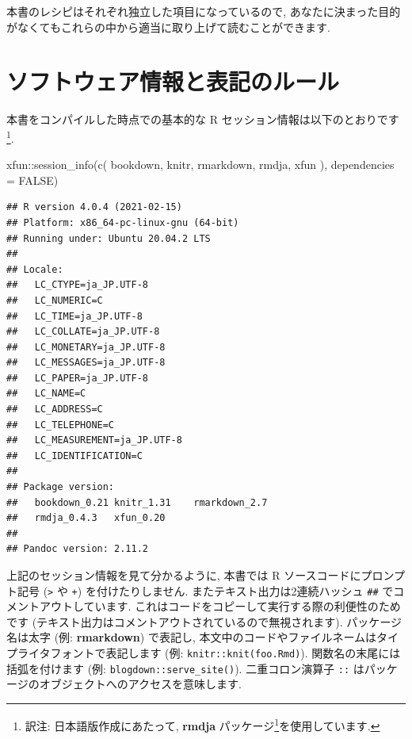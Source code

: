 \documentclass[
  11pt,
]{bxjsreport}
\newenvironment{Shaded}{\begin{snugshade}}{\end{snugshade}}
\newcommand{\AttributeTok}[1]{\textcolor[rgb]{0.77,0.63,0.00}{#1}}
\newcommand{\ConstantTok}[1]{\textcolor[rgb]{0.00,0.00,0.00}{#1}}
\newcommand{\FunctionTok}[1]{\textcolor[rgb]{0.00,0.00,0.00}{#1}}
\newcommand{\NormalTok}[1]{#1}
\newcommand{\SpecialCharTok}[1]{\textcolor[rgb]{0.00,0.00,0.00}{#1}}
\newcommand{\StringTok}[1]{\textcolor[rgb]{0.31,0.60,0.02}{#1}}
\renewcommand{\href}[2]{#2\footnote{\url{#1}}}
\begin{document}
本書のレシピはそれぞれ独立した項目になっているので, あなたに決まった目的がなくてもこれらの中から適当に取り上げて読むことができます.

\hypertarget{software-info}{%
\section*{ソフトウェア情報と表記のルール}\label{software-info}}

本書をコンパイルした時点での基本的な R セッション情報は以下のとおりです\footnote{訳注: 日本語版作成にあたって, \href{https://github.com/Gedevan-Aleksizde/rmdja}{\textbf{rmdja} パッケージ}を使用しています.}.

\begin{Shaded}
\begin{Highlighting}[numbers=left,,]
\NormalTok{xfun}\SpecialCharTok{::}\FunctionTok{session\_info}\NormalTok{(}\FunctionTok{c}\NormalTok{(}
  \StringTok{\textquotesingle{}bookdown\textquotesingle{}}\NormalTok{, }\StringTok{\textquotesingle{}knitr\textquotesingle{}}\NormalTok{, }\StringTok{\textquotesingle{}rmarkdown\textquotesingle{}}\NormalTok{, }\StringTok{\textquotesingle{}rmdja\textquotesingle{}}\NormalTok{, }\StringTok{\textquotesingle{}xfun\textquotesingle{}}
\NormalTok{), }\AttributeTok{dependencies =} \ConstantTok{FALSE}\NormalTok{)}
\end{Highlighting}
\end{Shaded}

\begin{verbatim}
## R version 4.0.4 (2021-02-15)
## Platform: x86_64-pc-linux-gnu (64-bit)
## Running under: Ubuntu 20.04.2 LTS
## 
## Locale:
##   LC_CTYPE=ja_JP.UTF-8      
##   LC_NUMERIC=C              
##   LC_TIME=ja_JP.UTF-8       
##   LC_COLLATE=ja_JP.UTF-8    
##   LC_MONETARY=ja_JP.UTF-8   
##   LC_MESSAGES=ja_JP.UTF-8   
##   LC_PAPER=ja_JP.UTF-8      
##   LC_NAME=C                 
##   LC_ADDRESS=C              
##   LC_TELEPHONE=C            
##   LC_MEASUREMENT=ja_JP.UTF-8
##   LC_IDENTIFICATION=C       
## 
## Package version:
##   bookdown_0.21 knitr_1.31    rmarkdown_2.7
##   rmdja_0.4.3   xfun_0.20    
## 
## Pandoc version: 2.11.2
\end{verbatim}

上記のセッション情報を見て分かるように, 本書では R ソースコードにプロンプト記号 (\texttt{\textgreater{}} や \texttt{+}) を付けたりしません. またテキスト出力は2連続ハッシュ \texttt{\#\#} でコメントアウトしています. これはコードをコピーして実行する際の利便性のためです (テキスト出力はコメントアウトされているので無視されます). パッケージ名は太字 (例: \textbf{rmarkdown}) で表記し, 本文中のコードやファイルネームはタイプライタフォントで表記します (例: \texttt{knitr::knit(\textquotesingle{}foo.Rmd\textquotesingle{})}). 関数名の末尾には括弧を付けます (例: \texttt{blogdown::serve\_site()}). 二重コロン演算子 \texttt{::} はパッケージのオブジェクトへのアクセスを意味します.
\end{document}
